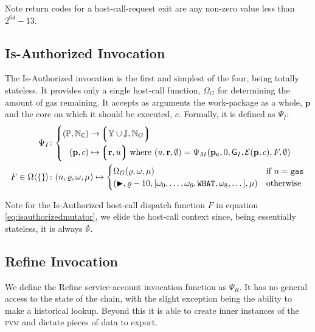 Note return codes for a host-call-request exit are any non-zero value less than $2^{64} - 13$.

\subsection{Is-Authorized Invocation}\label{sec:isauthorizedinvocation}

The Is-Authorized invocation is the first and simplest of the four, being totally stateless. It provides only a single host-call function, $\Omega_G$ for determining the amount of gas remaining. It accepts as arguments the work-package as a whole, $\mathbf{p}$ and the core on which it should be executed, $c$. Formally, it is defined as $\Psi_I$:
\begin{align}
  \Psi_I &\colon \left\{\begin{aligned}
    (\mathbb{P}, \N_\mathsf{C}) &\to \tuple{\Y \cup \mathbb{J}, \N_G} \\
    (\mathbf{p}, c) &\mapsto \tup{\mathbf{r}, u}\ \where (u, \mathbf{r}, \none) = \Psi_M(\mathbf{p}_\mathbf{c}, 0, \mathsf{G}_I, \mathcal{E}(\mathbf{p}, c), F, \none)
  \end{aligned}\right. \\
  \label{eq:isauthorizedmutator}F \in \Omega\ang{\{\}} &\colon
    (n, \gascounter, \registers, \memory) \mapsto \begin{cases}
      \Omega_G(\gascounter, \registers, \memory) &\when n = \mathtt{gas} \\
      (\continue, \gascounter - 10, [\registers_0, \dots, \registers_6, \mathtt{WHAT}, \registers_8, \dots], \memory) &\otherwise
    \end{cases}
\end{align}

Note for the Is-Authorized host-call dispatch function $F$ in equation \ref{eq:isauthorizedmutator}, we elide the host-call context since, being essentially stateless, it is always $\emptyset$.

\subsection{Refine Invocation}\label{sec:refineinvocation}

We define the Refine service-account invocation function as $\Psi_R$. It has no general access to the state of the \Jam chain, with the slight exception being the ability to make a historical lookup. Beyond this it is able to create inner instances of the \textsc{pvm} and dictate pieces of data to export.

